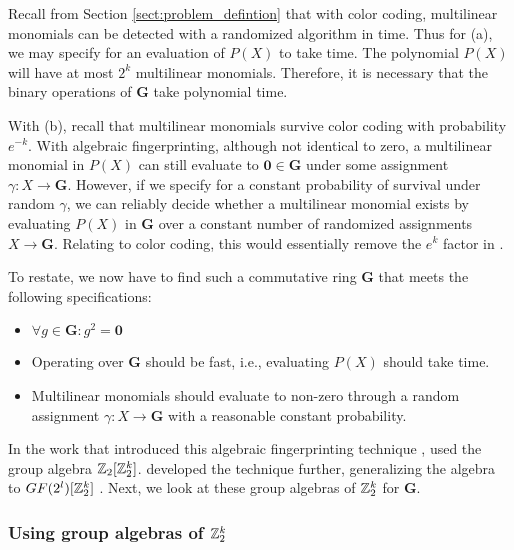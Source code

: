 Recall from Section \ref{sect:problem_defintion} 
that with color coding, multilinear monomials can be detected with a 
randomized algorithm in  time. Thus for (a), we may specify for 
an evaluation of $P(X)$ to take  time. The polynomial $P(X)$ 
will have at most $2^k$ multilinear monomials. Therefore, 
it is necessary that the binary operations 
of $\mathbf{G}$ take polynomial time.

With (b), recall that multilinear monomials 
survive color coding with probability $e^{-k}$. 
With algebraic fingerprinting, although not identical to zero, a multilinear monomial in $P(X)$ 
can still evaluate to $\mathbf{0} \in \mathbf{G}$ under some assignment $\gamma \colon X \to \mathbf{G}$. 
However, if we specify for a constant 
probability of survival under random $\gamma$, we can reliably decide whether a multilinear monomial exists 
by evaluating $P(X)$ in $\mathbf{G}$ over a constant number of 
randomized assignments $X \to \mathbf{G}$. Relating to color coding, 
this would essentially remove the 
$e^k$ factor in .

To restate, we now have to find such a commutative ring $\mathbf{G}$ that 
meets the following specifications: 
\begin{itemize}
  \item $\forall g \in \mathbf{G} \colon g^2 = \mathbf{0}$
  \item Operating over $\mathbf{G}$ should be fast, i.e., evaluating 
  $P(X)$ should take  time.
  \item Multilinear monomials should evaluate to non-zero
  through a random assignment 
  $\gamma \colon X \to \mathbf{G}$ with a reasonable constant probability.
\end{itemize}

In the work that introduced 
this algebraic fingerprinting technique \cite{Koutis08}, 
\citeauthor{Koutis08} used the group algebra $\mathbb Z_2[\mathbb Z_2^k]$. 
\citeauthor{Williams09} developed the technique further, 
generalizing the algebra to $GF(2^{l})[\mathbb Z_2^k]$ \cite{Williams09}. 
Next, we look at these group algebras of $\mathbb Z_2^k$ for $\mathbf{G}$. 

\subsubsection{Using group algebras of $\mathbb Z_2^k$}

